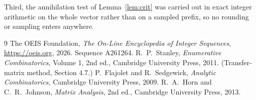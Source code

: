 \documentclass[11pt,a4paper]{article}
\theoremstyle{plain}
\theoremstyle{definition}
\begin{document}
Third, the annihilation test of Lemma~\ref{lem:crit} was carried out in exact integer
arithmetic on the whole vector rather than on a sampled prefix, so no rounding or sampling
enters anywhere.

\begin{thebibliography}{9}
 The OEIS Foundation, \emph{The On-Line Encyclopedia of Integer
Sequences}, \url{https://oeis.org}, 2026. Sequence A261264.
 R.~P.~Stanley, \emph{Enumerative Combinatorics}, Volume 1, 2nd ed.,
Cambridge University Press, 2011. (Transfer-matrix method, Section 4.7.)
 P.~Flajolet and R.~Sedgewick, \emph{Analytic Combinatorics}, Cambridge
University Press, 2009.
 R.~A.~Horn and C.~R.~Johnson, \emph{Matrix Analysis}, 2nd ed., Cambridge
University Press, 2013.
\end{thebibliography}
\end{document}
